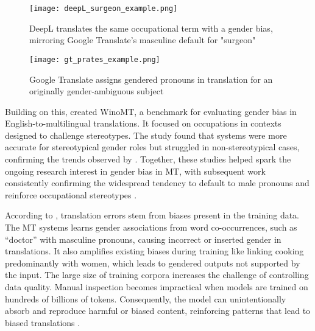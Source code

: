         \vspace{0.8em}
        \begin{figure}[htb]
            \centering
            \texttt{[image: deepL\_surgeon\_example.png]}
            \caption[Example of DeepL's biased translation]{DeepL translates the same occupational term with a gender bias, mirroring Google Translate's masculine default for "surgeon"}
            \label{fig:deepL_surgeon_example}
        \end{figure}

        \vspace{0.8em}
        \begin{figure}[htb]
            \centering
            \texttt{[image: gt\_prates\_example.png]}
            \caption[Google Translate Gendered Pronoun Suggestions]{Google Translate assigns gendered pronouns in translation for an originally gender-ambiguous subject}
            \label{fig:gt_prates_example}
        \end{figure}

        Building on this, \textcite{stanovskyEvaluatingGenderBias2019} created WinoMT, a benchmark for evaluating gender bias in English-to-multilingual translations. It focused on occupations in contexts designed to challenge stereotypes. The study found that systems were more accurate for stereotypical gender roles but struggled in non-stereotypical cases, confirming the trends observed by \citeauthor{pratesAssessingGenderBias2019}.
        Together, these studies helped spark the ongoing research interest in gender bias in MT, with subsequent work consistently confirming the widespread tendency to default to male pronouns and reinforce occupational stereotypes \parencite{lardelliBuildingBridgesDataset2024, choMeasuringGenderBias2019}.
        
        According to \textcite{ullmannGenderBiasMachine2022}, translation errors stem from biases present in the training data. The MT systems learns gender associations from word co-occurrences, such as “doctor” with masculine pronouns, causing incorrect or inserted gender in translations. It also amplifies existing biases during training like linking cooking predominantly with women, which leads to gendered outputs not supported by the input. The large size of training corpora increases the challenge of controlling data quality. Manual inspection becomes impractical when models are trained on hundreds of billions of tokens. Consequently, the model can unintentionally absorb and reproduce harmful or biased content, reinforcing patterns that lead to biased translations \citep{ullmannGenderBiasMachine2022}.


